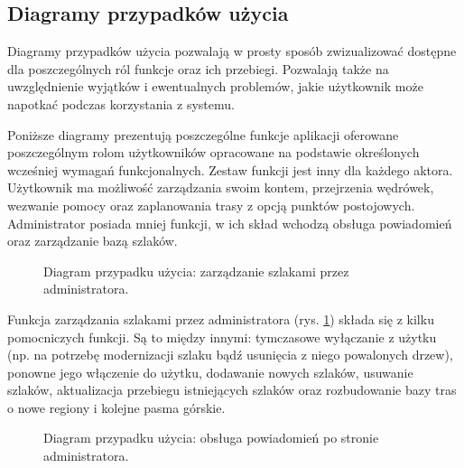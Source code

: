     \subsection{Diagramy przypadków użycia}
    Diagramy przypadków użycia pozwalają w prosty sposób zwizualizować dostępne dla poszczególnych ról funkcje oraz ich przebiegi. Pozwalają także na uwzględnienie wyjątków i ewentualnych problemów, jakie użytkownik może napotkać podczas korzystania z systemu.

    Poniższe diagramy prezentują poszczególne funkcje aplikacji oferowane poszczególnym rolom użytkowników opracowane na podstawie określonych wcześniej wymagań funkcjonalnych. Zestaw funkcji jest inny dla każdego aktora. Użytkownik ma możliwość zarządzania swoim kontem, przejrzenia wędrówek, wezwanie pomocy oraz zaplanowania trasy z opcją punktów postojowych. Administrator posiada mniej funkcji, w ich skład wchodzą obsługa powiadomień oraz zarządzanie bazą szlaków.
    \setlength{\fboxrule}{0.5pt}
    \begin{figure}[H]
        \centering
        \caption{Diagram przypadku użycia: zarządzanie szlakami przez administratora.}
        \label{ucd:szlaki}
    \end{figure}
    Funkcja zarządzania szlakami przez administratora (rys. \ref{ucd:szlaki}) składa się z kilku pomocniczych funkcji. Są to między innymi: tymczasowe wyłączanie z użytku (np. na potrzebę modernizacji szlaku bądź usunięcia z niego powalonych drzew), ponowne jego włączenie do użytku, dodawanie nowych szlaków, usuwanie szlaków, aktualizacja przebiegu istniejących szlaków oraz rozbudowanie bazy tras o nowe regiony i kolejne pasma górskie.

    \setlength{\fboxrule}{0.5pt}
    \begin{figure}[H]
        \centering
        \caption{Diagram przypadku użycia: obsługa powiadomień po stronie administratora.}
        \label{ucd:powiadomienia}
    \end{figure}
    
